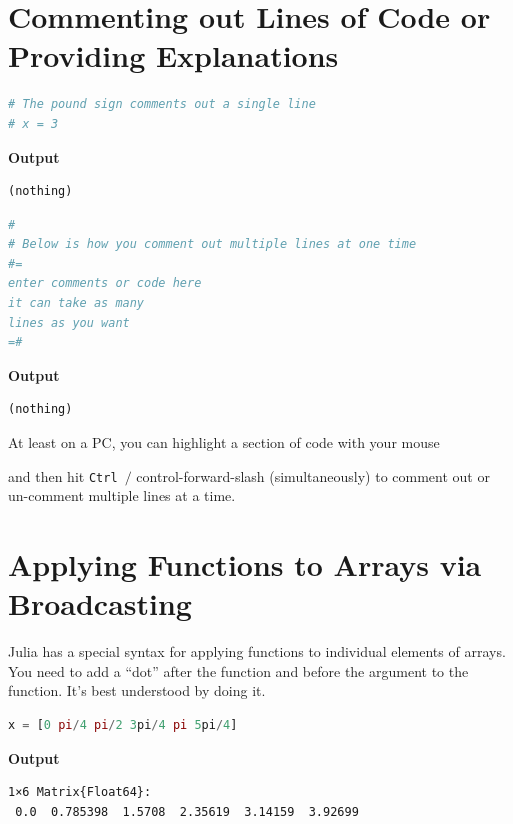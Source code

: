 \section{Commenting out Lines of Code or Providing Explanations}


\begin{lstlisting}[language=Julia,style=mystyle]
# The pound sign comments out a single line
# x = 3
\end{lstlisting}
\textbf{Output} 
\begin{verbatim}
(nothing)
\end{verbatim}


\begin{lstlisting}[language=Julia,style=mystyle]
#
# Below is how you comment out multiple lines at one time
#=
enter comments or code here
it can take as many 
lines as you want
=#
\end{lstlisting}
\textbf{Output} 
\begin{verbatim}
(nothing)
\end{verbatim}

At least on a PC, you can highlight a section of code with your mouse\\

\setlength{\fboxrule}{3pt}%
	\centerline{ %
}

and then hit \texttt{Ctrl\,$/$} control-forward-slash (simultaneously) to comment out or un-comment multiple lines at a time. \\

\setlength{\fboxrule}{3pt}%
	\centerline{ %
}


\section{Applying Functions to Arrays via Broadcasting}

Julia has a special syntax for applying functions to individual elements of arrays. You need to add a ``dot'' after the function and before the argument to the function. It's best understood by doing it. 

\begin{lstlisting}[language=Julia,style=mystyle]
x = [0 pi/4 pi/2 3pi/4 pi 5pi/4]
\end{lstlisting}
\textbf{Output} 
\begin{verbatim}
1×6 Matrix{Float64}:
 0.0  0.785398  1.5708  2.35619  3.14159  3.92699
\end{verbatim}

